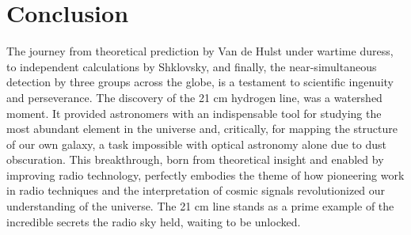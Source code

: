 \documentclass{../template/texnote}
\begin{document}
\section{Conclusion}

The journey from theoretical prediction by Van de Hulst under wartime duress, to independent calculations by Shklovsky, and finally, the near-simultaneous detection by three groups across the globe, is a testament to scientific ingenuity and perseverance.
The discovery of the 21 cm hydrogen line, was a watershed moment. It provided astronomers with an indispensable tool for studying the most abundant element in the universe and, critically, for mapping the structure of our own galaxy, a task impossible with optical astronomy alone due to dust obscuration. This breakthrough, born from theoretical insight and enabled by improving radio technology, perfectly embodies the theme of how pioneering work in radio techniques and the interpretation of cosmic signals revolutionized our understanding of the universe. The 21 cm line stands as a prime example of the incredible secrets the radio sky held, waiting to be unlocked.

%
    \printbibliography
\end{document}
